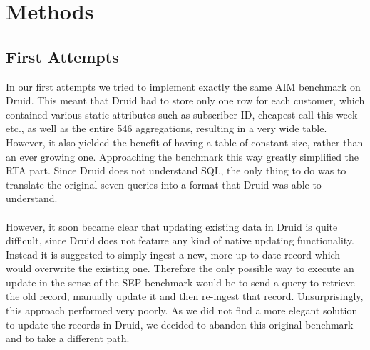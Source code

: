 \documentclass[11pt,singlecolumn]{scrartcl}
\begin{document}
\section{Methods}

\subsection{First Attempts}
In our first attempts we tried to implement exactly the same AIM benchmark on Druid. This meant that Druid had to store only one row for each customer, which contained various static attributes such as subscriber-ID, cheapest call this week etc., as well as the entire 546 aggregations, resulting in a very wide table. However, it also yielded the benefit of having a table of constant size, rather than an ever growing one. Approaching the benchmark this way greatly simplified the RTA part. Since Druid does not understand SQL, the only thing to do was to translate the original seven queries into a format that Druid was able to understand.\\\\
However, it soon became clear that updating existing data in Druid is quite difficult, since Druid does not feature any kind of native updating functionality. Instead it is suggested to simply ingest a new, more up-to-date record which would overwrite the existing one. Therefore the only possible way to execute an update in the sense of the SEP benchmark would be to send a query to retrieve the old record, manually update it and then re-ingest that record. Unsurprisingly, this approach performed very poorly. As we did not find a more elegant solution to update the records in Druid, we decided to abandon this original benchmark and to take a different path.    
\\[0.6 cm]
\end{document}
